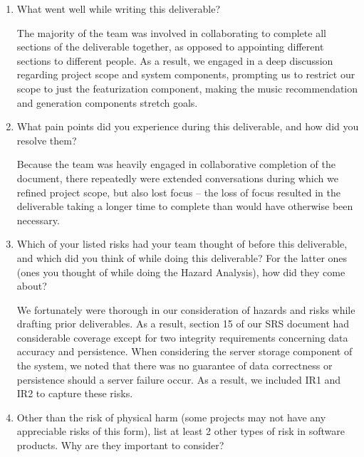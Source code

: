 \documentclass{article}
\begin{document}


\begin{enumerate}
    \item What went well while writing this deliverable?
    
    The majority of the team was involved in collaborating to complete all sections of the deliverable together, as opposed to appointing different sections to different people. As a result, we engaged in a deep discussion regarding project scope and system components, prompting us to restrict our scope to just the featurization component, making the music recommendation and generation components stretch goals.

    \item What pain points did you experience during this deliverable, and how did you resolve them?
    
    Because the team was heavily engaged in collaborative completion of the document, there repeatedly were extended conversations during which we refined project scope, but also lost focus -- the loss of focus resulted in the deliverable taking a longer time to complete than would have otherwise been necessary.

    \item Which of your listed risks had your team thought of before this deliverable, and which did you think of while doing this deliverable? For the latter ones (ones you thought of while doing the Hazard Analysis), how did they come about?
    
    We fortunately were thorough in our consideration of hazards and risks while drafting prior deliverables. As a result, section 15 of our SRS document had considerable coverage except for two integrity requirements concerning data accuracy and persistence. When considering the server storage component of the system, we noted that there was no guarantee of data correctness or persistence should a server failure occur. As a result, we included IR1 and IR2 to capture these risks.

    \item Other than the risk of physical harm (some projects may not have any appreciable risks of this form), list at least 2 other types of risk in software products. Why are they important to consider?
    

\end{enumerate}
\end{document}

